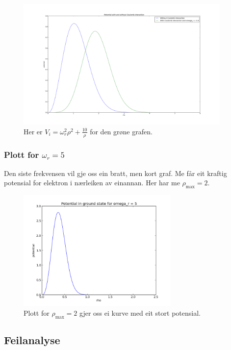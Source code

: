 \documentclass[11pt, a4paper]{article}
\begin{document}
      \begin{figure}[H]
        \centering
        \includegraphics[width=400px]{omega1to10.png}
        \caption{Her er $V_i = \omega_r^2\rho^2 + \frac{10}{\rho}$ for den grøne grafen.}
      \end{figure}

    \subsubsection{Plott for $\omega_r = 5$}
      Den siste frekvensen vil gje oss ein bratt, men kort graf. Me får eit kraftig potensial for elektron i nærleiken av einannan. Her har me $\rho_{\text{max}} = 2$.
      \begin{figure}[H]
        \centering
        \includegraphics[width=300px]{omega5.png}
        \caption{Plott for $\rho_{\text{max}} = 2$ gjer oss ei kurve med eit stort potensial.}
      \end{figure}




  \subsection{Feilanalyse}
    
\end{document}
